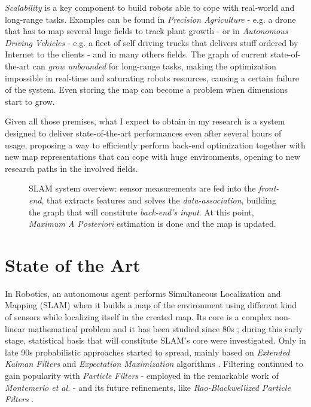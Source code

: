 \documentclass[10pt,a4paper, notitlepage]{report}
\begin{document}
\textit{Scalability} is a key component to build robots able to cope with real-world and long-range tasks. Examples can be found in \textit{Precision Agriculture} - e.g. a drone that has to map several huge fields to track plant growth - or in \textit{Autonomous Driving Vehicles} - e.g. a fleet of self driving trucks that delivers stuff ordered by Internet to the clients - and in many others fields. The graph of current state-of-the-art can \textit{grow unbounded} for long-range tasks, making the optimization impossible in real-time and saturating robots resources, causing a certain failure of the system. Even storing the map can become a problem when dimensions start to grow.

\vspace{10px}

Given all those premises, what I expect to obtain in my research is a system designed to deliver state-of-the-art performances even after several hours of usage, proposing a way to efficiently perform back-end optimization together with new map representations that can cope with huge environments, opening to new research paths in the involved fields.

\begin{figure}
    \centering
    \resizebox{0.8\textwidth}{!}{}
    \caption{SLAM system overview: sensor measurements are fed into the \textit{front-end}, that extracts features and solves the \textit{data-association}, building the graph that will constitute \textit{back-end's input}. At this point, \textit{Maximum A Posteriori} estimation is done and the map is updated.}
    \label{fig:slam-overview}
\end{figure}


\section*{State of the Art}
In Robotics, an autonomous agent performs Simultaneous Localization and Mapping (SLAM) when it builds a map of the environment using different kind of sensors while localizing itself in the created map. Its core is a complex non-linear mathematical problem and it has been studied since 80s \cite{durrant2006simultaneous} \cite{bailey2006simultaneous}; during this early stage, statistical basis that will constitute SLAM's core were investigated. Only in late 90s probabilistic approaches started to spread, mainly based on \textit{Extended Kalman Filters} \cite{leonard1990dynamic} \cite{dissanayake2001solution} and \textit{Expectation Maximization} algorithms \cite{dellaert2003mcmc} \cite{thrun2001probabilistic}. Filtering continued to gain popularity with \textit{Particle Filters} - employed in the remarkable work of \textit{Montemerlo et al.} \cite{montemerlo2002fastslam} - and its future refinements, like \textit{Rao-Blackwellized Particle Filters} \cite{grisetti2005improving} \cite{carlone2010rao} \cite{tipaldi2007heterogeneous}.
\end{document}
